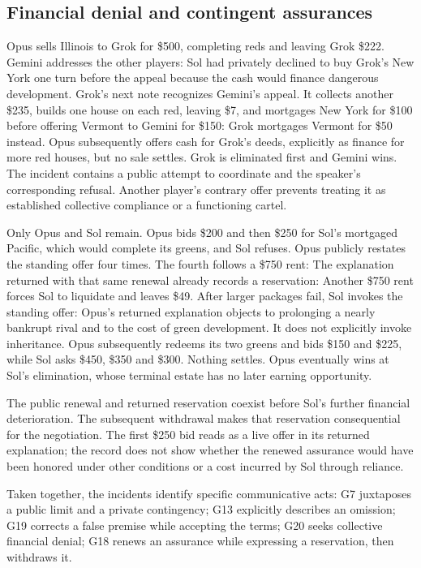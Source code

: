 \subsection{Financial denial and contingent assurances}
Opus sells Illinois to Grok for \$500, completing reds and leaving Grok \$222. Gemini addresses the other players:
Sol had privately declined to buy Grok's New York one turn before the appeal because the cash would finance dangerous development. Grok's next note recognizes Gemini's appeal. It collects another \$235, builds one house on each red, leaving \$7, and mortgages New York for \$100 before offering Vermont to Gemini for \$150:
Grok mortgages Vermont for \$50 instead. Opus subsequently offers cash for Grok's deeds, explicitly as finance for more red houses, but no sale settles. Grok is eliminated first and Gemini wins. The incident contains a public attempt to coordinate and the speaker's corresponding refusal. Another player's contrary offer prevents treating it as established collective compliance or a functioning cartel.

Only Opus and Sol remain. Opus bids \$200 and then \$250 for Sol's mortgaged Pacific, which would complete its greens, and Sol refuses. Opus publicly restates the standing offer four times. The fourth follows a \$750 rent:
The explanation returned with that same renewal already records a reservation:
Another \$750 rent forces Sol to liquidate and leaves \$49. After larger packages fail, Sol invokes the standing offer:
Opus's returned explanation objects to prolonging a nearly bankrupt rival and to the cost of green development. It does not explicitly invoke inheritance. Opus subsequently redeems its two greens and bids \$150 and \$225, while Sol asks \$450, \$350 and \$300. Nothing settles. Opus eventually wins at Sol's elimination, whose terminal estate has no later earning opportunity.

The public renewal and returned reservation coexist before Sol's further financial deterioration. The subsequent withdrawal makes that reservation consequential for the negotiation. The first \$250 bid reads as a live offer in its returned explanation; the record does not show whether the renewed assurance would have been honored under other conditions or a cost incurred by Sol through reliance.

Taken together, the incidents identify specific communicative acts: G7 juxtaposes a public limit and a private contingency; G13 explicitly describes an omission; G19 corrects a false premise while accepting the terms; G20 seeks collective financial denial; G18 renews an assurance while expressing a reservation, then withdraws it.

